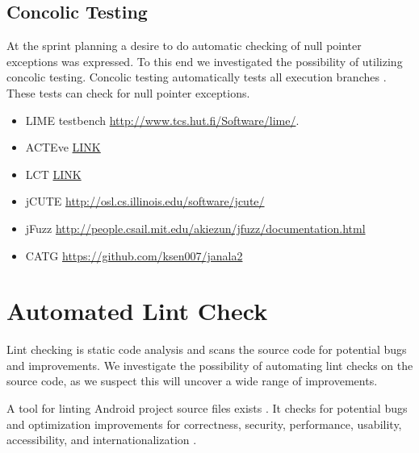 \subsection{Concolic Testing}
At the sprint planning a desire to do automatic checking of null pointer exceptions was expressed. To this end we investigated the possibility of utilizing concolic testing. Concolic testing automatically tests all execution branches \parencite{concolic_testing_2015}. These tests can check for null pointer exceptions.


\begin{itemize}
  \item LIME testbench \url{http://www.tcs.hut.fi/Software/lime/}.
  \item ACTEve \href{http://delivery.acm.org/10.1145/2400000/2393666/a59-anand.pdf?ip=130.225.198.195&id=2393666&acc=ACTIVE\%20SERVICE&key=36332CD97FA87885\%2E1DDFD8390336D738\%2E4D4702B0C3E38B35\%2E4D4702B0C3E38B35&CFID=627209490&CFTOKEN=76801213&__acm__=1424945812_ab641600a5058e5b199a617b521e4023}{LINK}
\end{itemize}


\begin{itemize}
  \item LCT \href{http://users.ics.aalto.fi/ktkahkon/KahLauSaaKauHelNie-BYTECODE2011.pdf}{LINK}
  \item jCUTE \url{http://osl.cs.illinois.edu/software/jcute/}
  \item jFuzz \url{http://people.csail.mit.edu/akiezun/jfuzz/documentation.html}
  \item CATG \url{https://github.com/ksen007/janala2}
\end{itemize}


\section{Automated Lint Check}\label{sec:automated_lint}
Lint checking is static code analysis and scans the source code for potential bugs and improvements. We investigate the possibility of automating lint checks on the source code, as we suspect this will uncover a wide range of improvements.

A tool for linting Android project source files exists . It checks for potential bugs and optimization improvements for correctness, security, performance, usability, accessibility, and internationalization \parencite{AndroidLint}.

